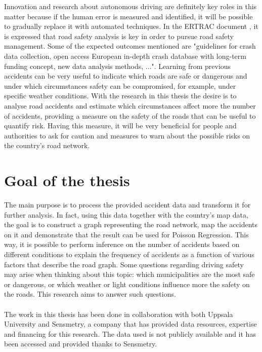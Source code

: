     Innovation and research about autonomous driving are definitely key roles in this matter because if the human error is measured and identified, it will be possible to gradually replace it with automated techniques. In the \ac{ERTRAC} document \cite{ertrac}, it is expressed that road safety analysis is key in order to pursue road safety management. Some of the expected outcomes mentioned are "guidelines for crash data collection, open access European in-depth crash database with long-term funding concept, new data analysis methods, ...". Learning from previous accidents can be very useful to indicate which roads are safe or dangerous and under which circumstances safety can be compromised, for example, under specific weather conditions. With the research in this thesis the desire is to analyse road accidents and estimate which circumstances affect more the number of accidents, providing a measure on the safety of the roads that can be useful to quantify risk. Having this measure, it will be very beneficial for people and authorities to ask for caution and measures to warn about the possible risks on the country's road network. 
   
\section{Goal of the thesis}
The main purpose is to process the provided accident data and transform it for further analysis. In fact, using this data together with the country's map data, the goal is to construct a graph representing the road network, map the accidents on it and demonstrate that the result can be used for Poisson Regression. This way, it is possible to perform inference on the number of accidents based on different conditions to explain the frequency of accidents as a function of various factors that describe the road graph. Some questions regarding driving safety may arise when thinking about this topic: which municipalities are the most safe or dangerous, or which weather or light conditions influence more the safety on the roads. This research aims to answer such questions.
\\
\\ 
The work in this thesis has been done in collaboration with both Uppsala University and
Sensmetry, a company that has provided data resources, expertise and financing for this research.
The data used is not publicly available and it has been accessed and provided thanks to
Sensmetry.
